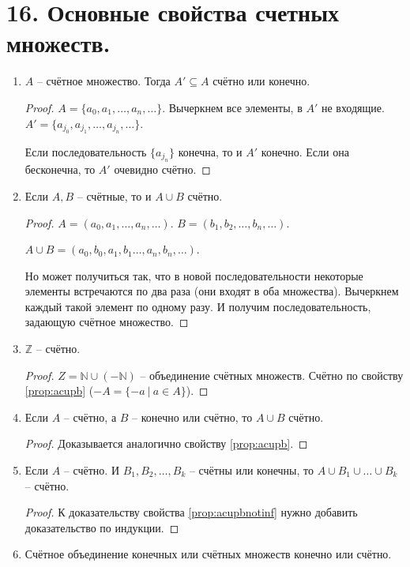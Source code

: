 \documentclass[a4paper, 12pt]{article}
\newcommand{\Z}{\mathbb{Z}}
\newcommand{\N}{\mathbb{N}}
\begin{document}
\section*{16. Основные свойства счетных множеств.}

\begin{enumerate}
        \item
            \label{prop:AsubsetA}
            $A$ -- счётное множество. Тогда $A' \subseteq A$ счётно или конечно.
            \begin{proof}
                $A = \{a_0, a_1, \ldots, a_n, \ldots\}$. Вычеркнем все элементы, в $A'$
                не входящие. $A' = \{a_{j_0}, a_{j_1}, \ldots, a_{j_n}, \ldots\}$.

                Если последовательность $\{a_{j_n}\}$ конечна, то и $A'$ конечно.
                Если она бесконечна, то $A'$ очевидно счётно.
            \end{proof}
        \item 
            \label{prop:acupb}
            Если $A,B$ -- счётные, то и $A \cup B$ счётно.
            \begin{proof}
                $A = (a_0, a_1, \ldots, a_n, \ldots)$. 
                $B = (b_1, b_2, \ldots, b_n, \ldots)$.

                $A \cup B = (a_0, b_0, a_1, b_1 \ldots, a_n, b_n, \ldots)$.

                Но может получиться так, что в новой последовательности некоторые элементы
                встречаются по два раза (они входят в оба множества). Вычеркнем
                каждый такой элемент по одному разу. И получим последовательность,
                задающую счётное множество.
            \end{proof}
        \item $\Z$ -- счётно.
            \begin{proof}
                $Z = \N \cup (-\N)$ -- объединение счётных множеств. Счётно по свойству
                \ref{prop:acupb} ($-A = \{-a \ |\ a \in A\}$).
            \end{proof}
        \item 
            \label{prop:acupbnotinf}
            Если $A$ -- счётно, а $B$ -- конечно или счётно, то $A \cup B$ счётно.
            \begin{proof}
                Доказывается аналогично свойству \ref{prop:acupb}.
            \end{proof}
       \item Если $A$ -- счётно. И $B_1, B_2, \ldots, B_k$ -- счётны или конечны, то
            $A \cup B_1 \cup \ldots \cup B_k$ -- счётно.
            \begin{proof}
                К доказательству свойства \ref{prop:acupbnotinf} нужно добавить
                доказательство по индукции.
            \end{proof}
       \item
           \label{prop:Fsetcup}
           Счётное объединение конечных или счётных множеств конечно или счётно.


\end{enumerate}
\end{document}
